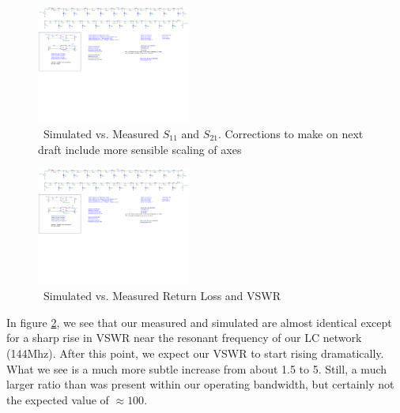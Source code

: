 \documentclass[journal]{IEEEtran} \usepackage[english]{babel}
\begin{document}
\begin{figure}[htb]
\centering
\includegraphics[width=0.45\textwidth,page = 2]{Fixed_ZeroBias_Sparam_Sims.pdf}
\caption{\ Simulated vs. Measured $S_{11}$ and $S_{21}$. Corrections to make on next draft include more sensible scaling of axes
}\label{fig:S11_S21}
\end{figure}



\begin{figure}[htb]
\centering
\includegraphics[width=0.45\textwidth,page = 3]{Fixed_ZeroBias_Sparam_Sims.pdf}
\caption{\ Simulated vs. Measured Return Loss and VSWR
}\label{fig:VSWRandReturnLoss}
\end{figure}

In figure \ref{fig:VSWRandReturnLoss}, we see that our measured and simulated
are almost identical except for a sharp rise in VSWR near the resonant frequency
of our LC network (144Mhz). After this point, we expect our VSWR to start rising
dramatically. What we see is a much more subtle increase from about 1.5 to 5.
Still, a much larger ratio than was present within our operating bandwidth, but
certainly not the expected value of $\approx 100$.





\end{document}
